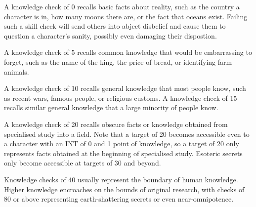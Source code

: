 A knowledge check of 0 recalls basic facts about reality, such as the country
a character is in, how many moons there are, or the fact that oceans exist.
Failing such a skill check will send others into abject disbelief and cause
them to question a character's sanity, possibly even damaging their dispostion.

A knowledge check of 5 recalls common knowledge that would be embarrassing to
forget, such as the name of the king, the price of bread, or identifying farm
animals.

A knowledge check of 10 recalls general knowledge that most people know, such
as recent wars, famous people, or religious customs. A knowledge check of 15
recalls similar general knowledge that a large minority of people know.

A knowledge check of 20 recalls obscure facts or knowledge obtained
from specialised study into a field. Note that a target of 20 becomes
accessible even to a character with an INT of 0 and 1 point of knowledge, so
a target of 20 only represents facts obtained at the beginning of specialised
study. Esoteric secrets only become accessible at targets of 30 and beyond.

Knowledge checks of 40 usually represent the boundary of human knowledge.
Higher knowledge encroaches on the bounds of original research, with checks
of 80 or above representing earth-shattering secrets or even near-omnipotence.

